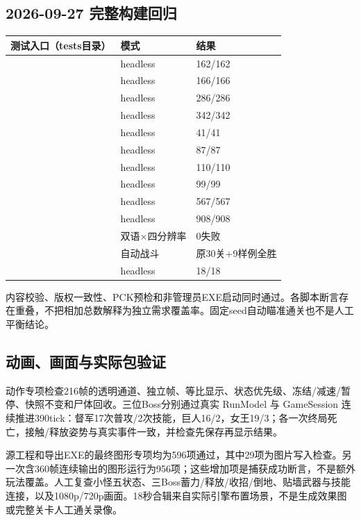 \documentclass[UTF8,a4paper,11pt,fontset=windows]{ctexart}
\begin{document}
\subsection{2026-09-27 完整构建回归}
\begin{tabularx}{\linewidth}{@{}Y P{29mm}P{29mm}@{}}
\toprule
测试入口（tests目录） & 模式 & 结果\\\midrule
{} & headless & 162/162\\
 & headless & 166/166\\
 & headless & 286/286\\
 & headless & 342/342\\
 & headless & 41/41\\
 & headless & 87/87\\
 & headless & 110/110\\
 & headless & 99/99\\
 & headless & 567/567\\
 & headless & 908/908\\
 & 双语×四分辨率 & 0失败\\
 & 自动战斗 & 原30关+9样例全胜\\
 & headless & 18/18\\
\bottomrule
\end{tabularx}
内容校验、版权一致性、PCK预检和非管理员EXE启动同时通过。各脚本断言存在重叠，不把相加总数解释为独立需求覆盖率。固定seed自动瞄准通关也不是人工平衡结论。

\subsection{动画、画面与实际包验证}
动作专项检查216帧的透明通道、独立帧、等比显示、状态优先级、冻结/减速/暂停、快照不变和尸体回收。三位Boss分别通过真实 RunModel 与 GameSession 连续推进390tick：督军17次普攻/2次技能，巨人16/2，女王19/3；各一次终局死亡，接触/释放姿势与真实事件一致，并检查先保存再显示结果。

源工程和导出EXE的最终图形专项均为596项通过，其中29项为图片写入检查。另一次含360帧连续输出的图形运行为956项；这些增加项是捕获成功断言，不是额外玩法覆盖。人工复查小怪五状态、三Boss蓄力/释放/收招/倒地、贴墙武器与技能连接，以及1080p/720p画面。18秒合辑来自实际引擎布置场景，不是生成效果图或完整关卡人工通关录像。
\end{document}
